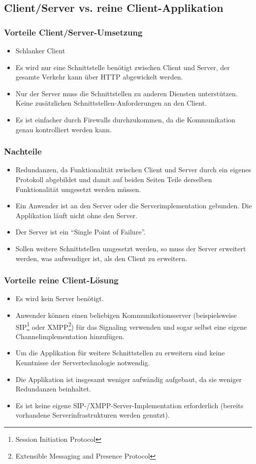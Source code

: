 	\subsection{Client/Server vs. reine Client-Applikation}
		\subsubsection{Vorteile Client/Server-Umsetzung}
		\begin{itemize}
			\item Schlanker Client
			\item Es wird nur eine Schnittstelle benötigt zwischen Client und Server, der gesamte Verkehr kann über HTTP abgewickelt werden.
			\item Nur der Server muss die Schnittstellen zu anderen Diensten
			unterstützen. Keine zusätzlichen Schnittstellen-Anforderungen an den Client.
			\item Es ist einfacher durch Firewalls durchzukommen, da die Kommunikation genau kontrolliert werden kann.
		\end{itemize}
		\subsubsection{Nachteile}
		\begin{itemize}
			\item Redundanzen, da Funktionalität zwischen Client und Server durch
			ein eigenes Protokoll abgebildet und damit auf beiden Seiten Teile derselben
			Funktionalität umgesetzt werden müssen.
			\item Ein Anwender ist an den Server oder die Serverimplementation gebunden.
			Die Applikation läuft nicht ohne den Server.
			\item Der Server ist ein ``Single Point of Failure''.
			\item Sollen weitere Schnittstellen umgesetzt werden, so muss der Server
			erweitert werden, was aufwendiger ist, als den Client zu erweitern.
		\end{itemize}


		\subsubsection{Vorteile reine Client-Lösung}
		\begin{itemize}
			\item Es wird kein Server benötigt.
			\item Anwender können einen beliebigen Kommunikationsserver
			(beispielsweise SIP\footnote{Session Initiation Protocol} oder
			XMPP\footnote{Extensible Messaging and Presence Protocol}) für das
			Signaling verwenden und sogar selbst eine eigene Channelimplementation
			hinzufügen.
			\item Um die Applikation für weitere Schnittstellen zu erweitern sind keine
			Kenntnisse der Servertechnologie notwendig.
			\item Die Applikation ist insgesamt weniger aufwändig aufgebaut, da sie
			weniger Redundanzen beinhaltet.
			\item Es ist keine eigene SIP-/XMPP-Server-Implementation erforderlich
			(bereits vorhandene Serverinfrastrukturen werden genutzt).
		\end{itemize}
